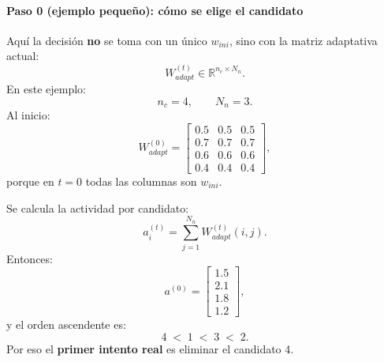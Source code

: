 \documentclass[11pt,a4paper]{article}
\begin{document}
\paragraph{Paso 0 (ejemplo pequeño): cómo se elige el candidato}
Aquí la decisión \textbf{no} se toma con un único $w_{ini}$, sino con la matriz
adaptativa actual:
\[
W_{adapt}^{(t)}\in\mathbb{R}^{n_c\times N_n}.
\]
En este ejemplo:
\[
n_c=4,\qquad N_n=3.
\]
Al inicio:
\[
W_{adapt}^{(0)}=
\begin{bmatrix}
0.5&0.5&0.5\\
0.7&0.7&0.7\\
0.6&0.6&0.6\\
0.4&0.4&0.4
\end{bmatrix},
\]
porque en $t=0$ todas las columnas son $w_{ini}$.

Se calcula la actividad por candidato:
\[
a_i^{(t)}=\sum_{j=1}^{N_n}W_{adapt}^{(t)}(i,j).
\]
Entonces:
\[
a^{(0)}=
\begin{bmatrix}
1.5\\2.1\\1.8\\1.2
\end{bmatrix},
\]
y el orden ascendente es:
\[
4\;<\;1\;<\;3\;<\;2.
\]
Por eso el \textbf{primer intento real} es eliminar el candidato 4.
\end{document}
